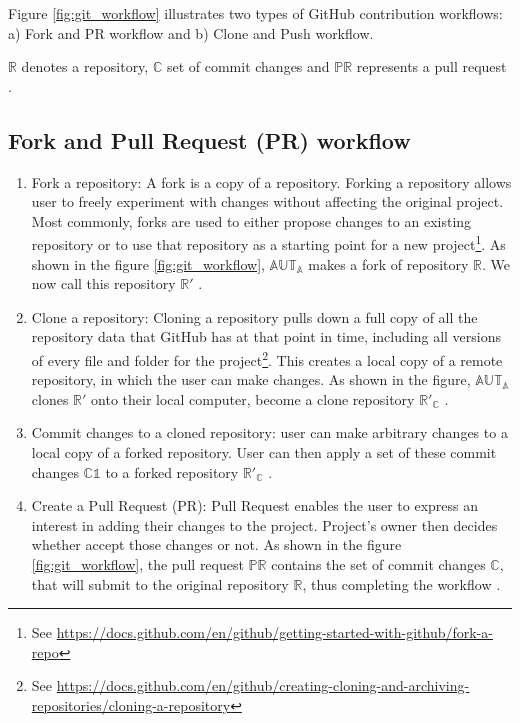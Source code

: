 Figure \ref{fig:git_workflow} illustrates two types of GitHub contribution workflows: a) Fork and PR workflow and b) Clone and Push workflow.

$\mathbb{R}$ denotes a repository, $\mathbb{C}$ set of commit changes and $\mathbb{PR}$ represents a pull request \cite{git_workflow}.

\subsection{Fork and Pull Request (PR) workflow}
\label{sec:fork_pr}

\begin{enumerate}
    \item Fork a repository: A fork is a copy of a repository.
    Forking a repository allows user to freely experiment with changes without affecting the original project.
    Most commonly, forks are used to either propose changes to an existing repository or to use that repository as a starting point for a new project\footnote{See \url{https://docs.github.com/en/github/getting-started-with-github/fork-a-repo}}.
    As shown in the figure \ref{fig:git_workflow}, $\mathbb{AUT_A}$ makes a fork of repository $\mathbb{R}$. We now call this repository $\mathbb{R'}$ \cite{git_workflow}.

    \item Clone a repository: Cloning a repository pulls down a full copy of all the repository data that GitHub has at that point in time, including all versions of every file and folder for the project\footnote{See \url{https://docs.github.com/en/github/creating-cloning-and-archiving-repositories/cloning-a-repository}}.
    This creates a local copy of a remote repository, in which the user can make changes.
    As shown in the figure, $\mathbb{AUT_A}$ clones $\mathbb{R'}$ onto their local computer, become a clone repository $\mathbb{R'_C}$ \cite{git_workflow}.
    
    \item Commit changes to a cloned repository: user can make arbitrary changes to a local copy of a forked repository.
    User can then apply a set of these commit changes $\mathbb{C1}$ to a forked repository $\mathbb{R'_C}$ \cite{git_workflow}.
    
    \item Create a Pull Request (PR): Pull Request enables the user to express an interest in adding their changes to the project.
    Project's owner then decides whether accept those changes or not.
    As shown in the figure \ref{fig:git_workflow}, the pull request $\mathbb{PR}$ contains the set of commit changes $\mathbb{C}$, that will submit to the original repository $\mathbb{R}$, thus completing the workflow \cite{git_workflow}.
\end{enumerate}


